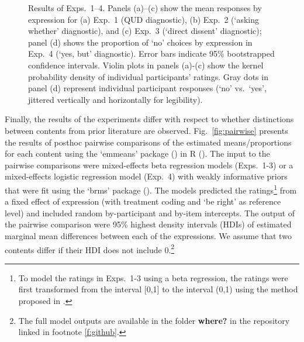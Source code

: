 \documentclass[times,linguex,xcolor]{glossa}
\begin{document}
 
  \begin{figure}[h!]
    \centering
    \hfill


    \hfill

    \caption{Results of Exps.~1--4. Panels (a)--(c) show the mean responses by expression for (a) Exp.~1 (QUD diagnostic),  (b) Exp.~2 (`asking whether' diagnostic), and (c) Exp.~3 (`direct dissent' diagnostic); panel (d) shows the proportion of `no' choices by expression in Exp.~4 (`yes, but' diagnostic). Error bars indicate 95\% bootstrapped confidence intervals. Violin plots in panels (a)-(c) show the kernel probability density of individual participants' ratings. Gray dots in panel (d) represent individual participant responses (`no' vs.\ `yes', jittered vertically and horizontally for legibility).}
    \label{fig:results}
  \end{figure}
  
  Finally, the results of the experiments differ with respect to whether distinctions between contents from prior literature are observed. Fig.~\ref{fig:pairwise} presents the results of posthoc pairwise comparisons of the estimated means/proportions for each content using the `emmeans' package (\citealt{emmeans}) in R (\citealt{r}). The input to the pairwise comparisons were mixed-effects beta regression models (Exps.~1-3) or a mixed-effects logistic regression model (Exp.~4) with weakly informative priors that were fit using the `brms' package (\citealt{buerkner2017}). The models predicted the  ratings\footnote{To model the ratings in Exps.~1-3 using a beta regression, the ratings were first transformed from the interval [0,1] to the interval (0,1) using the method proposed in \citealt{smithson-verkuilen2006}.} from a fixed effect of expression (with treatment coding and `be right' as reference level) and included random by-participant and by-item intercepts. The output of the pairwise comparison were 95\% highest density intervals (HDIs) of estimated marginal mean differences between each of the expressions. We assume that two contents differ if their HDI does not include 0.\footnote{The full model outputs are available in the folder {\bf where?} in the repository linked in footnote \ref{f:github}.} 
\end{document}

